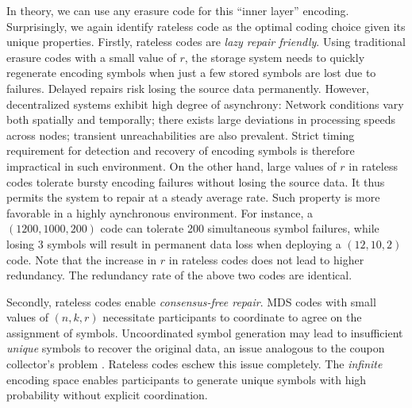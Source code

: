 In theory, we can use any erasure code for this ``inner layer'' encoding.
Surprisingly, we again identify rateless code as the optimal coding choice given its unique properties.
Firstly, rateless codes are \emph{lazy repair friendly}.
Using traditional erasure codes with a small value of $r$, the storage system needs to quickly regenerate encoding symbols when just a few stored symbols are lost due to failures.
Delayed repairs risk losing the source data permanently.
However, decentralized systems exhibit high degree of asynchrony:
Network conditions vary both spatially and temporally;
there exists large deviations in processing speeds across nodes;
transient unreachabilities are also prevalent.
Strict timing requirement for detection and recovery of encoding symbols is therefore impractical in such environment.
On the other hand, large values of $r$ in rateless codes tolerate bursty encoding failures without losing the source data.
It thus permits the system to repair at a steady average rate.
Such property is more favorable in a highly aynchronous environment.
For instance, a $(1200, 1000, 200)$ code can tolerate 200 simultaneous symbol failures, while losing 3 symbols will result in permanent data loss when deploying a $(12, 10, 2)$ code.
Note that the increase in $r$ in rateless codes does not lead to higher redundancy.
The redundancy rate of the above two codes are identical.

Secondly, rateless codes enable \emph{consensus-free repair}.
MDS codes with small values of $(n, k, r)$ necessitate participants to coordinate to agree on the assignment of symbols.
Uncoordinated symbol generation may lead to insufficient \emph{unique} symbols to recover the original data, an issue analogous to the coupon collector's problem \cite{ccp}.
Rateless codes eschew this issue completely.
The \emph{infinite} encoding space enables participants to generate unique symbols with high probability without explicit coordination.


